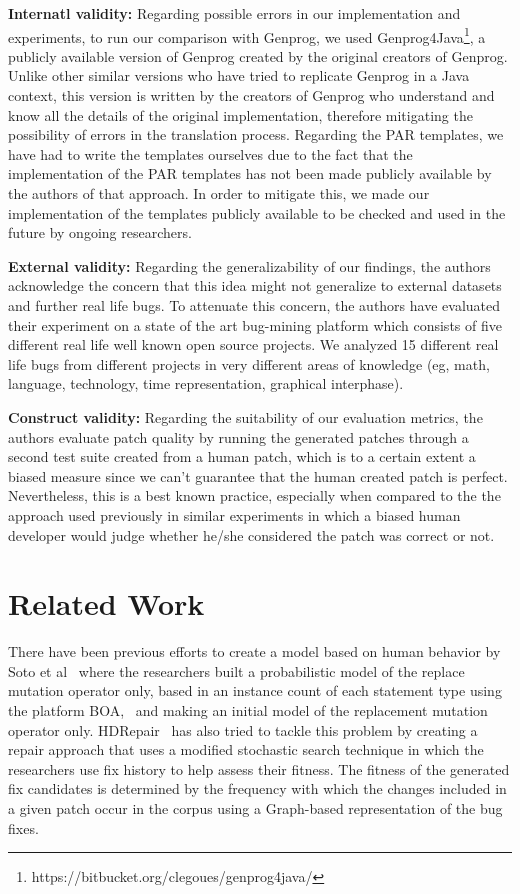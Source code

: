 \documentclass[conference]{IEEEtran}
\begin{document}
{\textbf{Internatl validity:}
Regarding possible errors in our implementation and experiments, to run our comparison with Genprog, we used Genprog4Java\footnote{https://bitbucket.org/clegoues/genprog4java/}, a publicly available version of Genprog created by the original creators of Genprog. Unlike other similar versions who have tried to replicate Genprog in a Java context, this version is written by the creators of Genprog who understand and know all the details of the original implementation, therefore mitigating the possibility of errors in the translation process. Regarding the PAR templates, we have had to write the templates ourselves due to the fact that the implementation of the PAR templates has not been made publicly available by the authors of that approach. In order to mitigate this, we made our implementation of the templates publicly available 
to be checked and used in the future by ongoing researchers.

\textbf{External validity:} 
Regarding the generalizability of our findings, the authors acknowledge the concern that this idea might not generalize to external datasets and further real life bugs. To attenuate this concern, the authors have evaluated their experiment on a state of the art bug-mining platform which consists of five different real life well known open source projects. We analyzed 15 different real life bugs from different projects in very different areas of knowledge (eg, math, language, technology, time representation, graphical interphase). 

\textbf{Construct validity:}
Regarding the suitability of our evaluation metrics, the authors evaluate patch quality by running the generated patches through a second test suite created from a human patch, which is to a certain extent a biased measure since we can't guarantee that the human created patch is perfect. Nevertheless, this is a best known practice, especially when compared to the the approach used previously in similar experiments in which a biased human developer would judge whether he/she considered the patch was correct or not.

\section{Related Work} \label{relatedWork}

There have been previous efforts to create a model based on human behavior by Soto et al~\cite{Soto15} 
where the researchers built a probabilistic model of the replace mutation 
operator only, based in 
an instance count of each statement type using the platform 
BOA,~\cite{dyer2013} and making an initial model of the replacement mutation 
operator only. HDRepair~\cite{xuan16} has also tried to tackle this problem by 
creating a repair approach that uses a modified stochastic search
technique in which the researchers use fix history
to help assess their fitness. The fitness of the generated
fix candidates is determined by the frequency with which the changes included in a given patch occur in the corpus using a Graph-based representation of the bug fixes.

}
\end{document}
